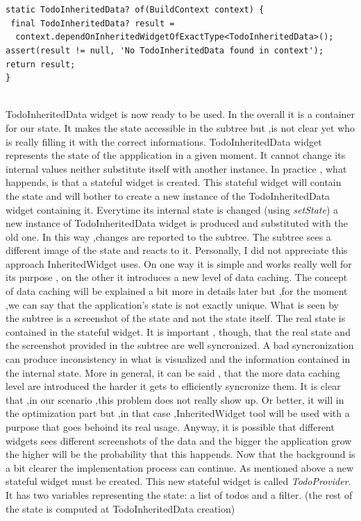 \mbox{}\\
\begin{code}
 \mbox{}
\begin{verbatim}

static TodoInheritedData? of(BuildContext context) {
 final TodoInheritedData? result =
  context.dependOnInheritedWidgetOfExactType<TodoInheritedData>(); 
assert(result != null, 'No TodoInheritedData found in context');
return result;
}
\end{verbatim}
\end{code}
\mbox{}\\

TodoInheritedData widget is now ready to be used. In the overall it is a container for our state. It makes the state accessible in the subtree but ,is not clear yet who is really filling it with the correct informations. TodoInheritedData widget represents the state of the appplication in a given moment. It cannot change its internal values neither substitute itself with another instance. In practice , what happends, is that a stateful widget is created. This stateful widget will contain the state and will bother to create a new instance of the TodoInheritedData widget containing it. Everytime its internal state is changed (using \textit{setState}) a new instance of TodoInheritedData widget is produced and substituted with the old one. In this way ,changes are reported to the subtree. The subtree sees a different image of the state and reacts to it. Personally, I did not appreciate this approach InheritedWidget uses. On one way it is simple and works really well for its purpose , on the other it introduces a new level of data caching. The concept of data caching will be explained a bit more in details later but ,for the moment ,we can say that the application's state is not exactly unique. What is seen by the subtree is a screenshot of the state and not the state itself. The real state is contained in the stateful widget. It is important , though, that the real state and the screenshot provided in the subtree are well syncronized. A bad syncronization can produce inconsistency in what is visualized and the information contained in the internal state. More in general, it can be said , that the more data caching level are introduced the harder it gets to efficiently syncronize them. It is clear that ,in our scenario ,this problem does not really show up. Or better, it will in the optimization part but ,in that case ,InheritedWidget tool will be used with a purpose that goes behoind its real usage. Anyway, it is possible that different widgets sees different screenshots of the data and the bigger the application grow the higher will be the probability that this happends. Now that the background is a bit clearer the implementation process can continue. As mentioned above a new stateful widget must be created. This new stateful widget is called \textit{TodoProvider.} It has two variables representing the state: a list of todos and a filter. (the rest of the state is computed at TodoInheritedData creation)
